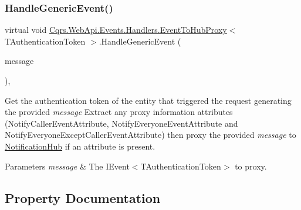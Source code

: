 \subsubsection{\texorpdfstring{Handle\+Generic\+Event()}{HandleGenericEvent()}}
{\footnotesize\ttfamily virtual void \hyperlink{classCqrs_1_1WebApi_1_1Events_1_1Handlers_1_1EventToHubProxy}{Cqrs.\+Web\+Api.\+Events.\+Handlers.\+Event\+To\+Hub\+Proxy}$<$ T\+Authentication\+Token $>$.Handle\+Generic\+Event (\begin{DoxyParamCaption}\item[{\hyperlink{interfaceCqrs_1_1Events_1_1IEvent}{I\+Event}$<$ T\+Authentication\+Token $>$}]{message }\end{DoxyParamCaption})\hspace{0.3cm}{\ttfamily [protected]}, {\ttfamily [virtual]}}



Get the authentication token of the entity that triggered the request generating the provided {\itshape message}  Extract any proxy information attributes (Notify\+Caller\+Event\+Attribute, Notify\+Everyone\+Event\+Attribute and Notify\+Everyone\+Except\+Caller\+Event\+Attribute) then proxy the provided {\itshape message}  to \hyperlink{classCqrs_1_1WebApi_1_1Events_1_1Handlers_1_1EventToHubProxy_a3e27dc5fb1315bc8200487fbf9b3b47f_a3e27dc5fb1315bc8200487fbf9b3b47f}{Notification\+Hub} if an attribute is present. 


\begin{DoxyParams}{Parameters}
{\em message} & The I\+Event$<$\+T\+Authentication\+Token$>$ to proxy.\\
\hline
\end{DoxyParams}


\subsection{Property Documentation}
\mbox{\label{classCqrs_1_1WebApi_1_1Events_1_1Handlers_1_1EventToHubProxy_af5593d8e6bace37fa52545c1f8e65e32_af5593d8e6bace37fa52545c1f8e65e32}} 
